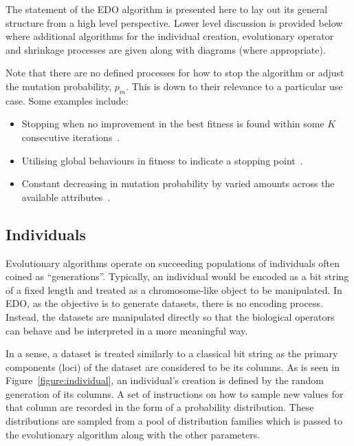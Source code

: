 The statement of the EDO algorithm is presented here to lay out its general
structure from a high level perspective. Lower level discussion is provided
below where additional algorithms for the individual creation, evolutionary
operator and shrinkage processes are given along with diagrams (where
appropriate).

Note that there are no defined processes for how to stop the algorithm or adjust
the mutation probability, \(p_m\). This is down to their relevance to a
particular use case. Some examples include:

\begin{itemize}
    \item Stopping when no improvement in the best fitness is found within some
        \(K\) consecutive iterations~\cite{Leung2001}.
    \item Utilising global behaviours in fitness to indicate a stopping
        point~\cite{Marti2016}.
    \item Constant decreasing in mutation probability by varied amounts across
        the available attributes~\cite{Kuehn2013}.
\end{itemize}

\subsection{Individuals}

Evolutionary algorithms operate on succeeding populations of individuals often
coined as ``generations''. Typically, an individual would be encoded as a bit
string of a fixed length and treated as a chromosome-like object to be
manipulated. In EDO, as the objective is to generate datasets, there is no
encoding process. Instead, the datasets are manipulated directly so that the
biological operators can behave and be interpreted in a more meaningful way.


In a sense, a dataset is treated similarly to a classical bit string as the
primary components (loci) of the dataset are considered to be its columns. As is
seen in Figure~\ref{figure:individual}, an individual's creation is defined by
the random generation of its columns. A set of instructions on how to sample new
values for that column are recorded in the form of a probability distribution.
These distributions are sampled from a pool of distribution families which is
passed to the evolutionary algorithm along with the other parameters.

